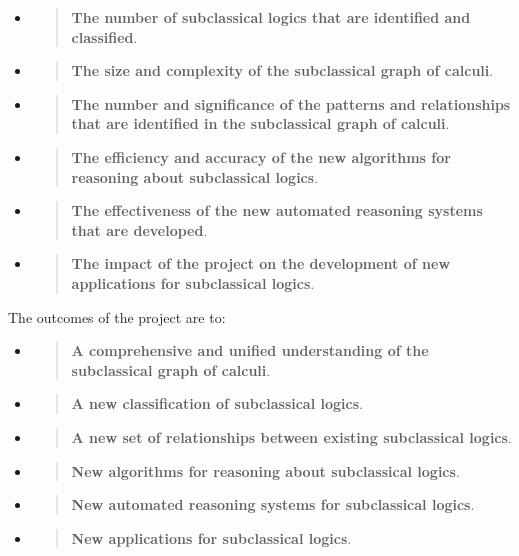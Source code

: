 \begin{itemize}
\item
  \begin{quote}
  \textbf{The number of subclassical logics that are identified and
  classified}.
  \end{quote}
\item
  \begin{quote}
  \textbf{The size and complexity of the subclassical graph of calculi}.
  \end{quote}
\item
  \begin{quote}
  \textbf{The number and significance of the patterns and relationships
  that are identified in the subclassical graph of calculi}.
  \end{quote}
\item
  \begin{quote}
  \textbf{The efficiency and accuracy of the new algorithms for
  reasoning about subclassical logics}.
  \end{quote}
\item
  \begin{quote}
  \textbf{The effectiveness of the new automated reasoning systems that
  are developed}.
  \end{quote}
\item
  \begin{quote}
  \textbf{The impact of the project on the development of new
  applications for subclassical logics}.
  \end{quote}
\end{itemize}

The outcomes of the project are to:

\begin{itemize}
\item
  \begin{quote}
  \textbf{A comprehensive and unified understanding of the subclassical
  graph of calculi}.
  \end{quote}
\item
  \begin{quote}
  \textbf{A new classification of subclassical logics}.
  \end{quote}
\item
  \begin{quote}
  \textbf{A new set of relationships between existing subclassical
  logics}.
  \end{quote}
\item
  \begin{quote}
  \textbf{New algorithms for reasoning about subclassical logics}.
  \end{quote}
\item
  \begin{quote}
  \textbf{New automated reasoning systems for subclassical logics}.
  \end{quote}
\item
  \begin{quote}
  \textbf{New applications for subclassical logics}.
  \end{quote}
\end{itemize}

